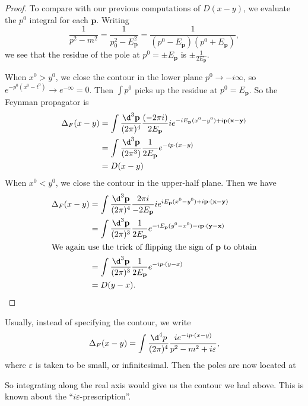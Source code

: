 \documentclass[a4paper]{article}
\begin{document}
\begin{proof}
  To compare with our previous computations of $D(x - y)$, we evaluate the $p^0$ integral for each $\mathbf{p}$. Writing
  \[
    \frac{1}{p^2 - m^2} = \frac{1}{p_0^2 - E_\mathbf{p}^2} = \frac{1}{(p^0 - E_\mathbf{p})(p^0 + E_\mathbf{p})},
  \]
  we see that the residue of the pole at $p^0 = \pm E_\mathbf{p}$ is $\pm \frac{1}{2E_\mathbf{p}}$.

  When $x^0 > y^0$, we close the contour in the lower plane $p^0 \to -i\infty$, so $e^{-p^0(x^0 - t^0)} \to e^{-\infty} = 0$. Then $\int p^0$ picks up the residue at $p^0 = E_\mathbf{p}$. So the Feynman propagator is
  \begin{align*}
    \Delta_F (x - y) &= \int \frac{\d ^3 \mathbf{p}}{(2\pi)^4} \frac{(-2\pi i)}{2E_\mathbf{p}} i e^{-iE_\mathbf{p}(x^0 - y^0) + i \mathbf{p} (\mathbf{x} - \mathbf{y})}\\
    &= \int \frac{\d^3 \mathbf{p}}{(2\pi^3)} \frac{1}{2 E_\mathbf{p}} e^{-ip \cdot (x - y)}\\
    &= D(x - y)
  \end{align*}
  When $x^0 < y^0$, we close the contour in the upper-half plane. Then we have
  \begin{align*}
    \Delta_F(x - y) &= \int \frac{\d^3 \mathbf{p}}{(2\pi)^4} \frac{2\pi i}{-2E_\mathbf{p}} i e^{iE_\mathbf{p} (x^0 - y^0) + i\mathbf{p} \cdot (\mathbf{x} - \mathbf{y})}\\
    &= \int \frac{\d^3 \mathbf{p}}{(2\pi)^3} \frac{1}{2E_\mathbf{p}} e^{-i E_\mathbf{p}(y^0 - x^0) - i \mathbf{p}\cdot (\mathbf{y} - \mathbf{x})}\\
    \intertext{We again use the trick of flipping the sign of $\mathbf{p}$ to obtain}
    &= \int \frac{\d^3 \mathbf{p}}{(2\pi)^3} \frac{1}{2E_\mathbf{p}} e^{-ip\cdot(y - x)}\\
    &= D(y - x).
  \end{align*}
\end{proof}
Usually, instead of specifying the contour, we write
\[
  \Delta_F(x - y) = \int \frac{\d^4 p}{(2\pi)^4} \frac{i e^{-ip\cdot(x - y)}}{p^2 - m^2 + i \varepsilon},
\]
where $\varepsilon$ is taken to be small, or infinitesimal. Then the poles are now located at
\begin{center}
\end{center}
So integrating along the real axis would give us the contour we had above. This is known about the ``$i\varepsilon$-prescription''.
\end{document}
